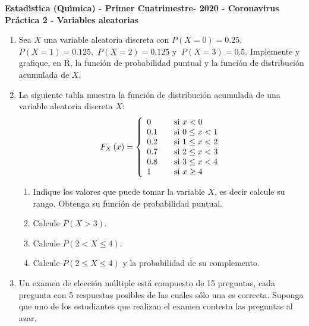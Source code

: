 \documentclass[11pt,a4paper,twoside]{article}%
\begin{document}
\begin{center}
\textbf{\textsf{Estad\'{\i}stica (Qu\'{\i}mica) - Primer Cuatrimestre- 2020 - Coronavirus}}\\
\vspace{0.2cm}
\textbf{Pr\'{a}ctica 2 - Variables aleatorias\vspace{-0.1in}}
\end{center}

\begin{enumerate}
\item Sea $X$ una variable aleatoria discreta con $P(X=0)=0.25,$
$P(X=1)=0.125,$ $P(X=2)=0.125$ y $\ P(X=3)=0.5$. Implemente y grafique, en R, la funci\'{o}n de
probabilidad puntual y la funci\'{o}n de distribuci\'{o}n acumulada de $X$.

\item La siguiente tabla muestra la funci\'{o}n de distribuci\'{o}n acumulada
de una variable aleatoria discreta $X$:%
\[
F_{X}\left(  x\right)  =\left\{
\begin{array}
[c]{lll}%
0 &  & \text{si }x<0\\
0.1 &  & \text{si }0\leq x<1\\
0.2 &  & \text{si }1\leq x<2\\
0.7 &  & \text{si }2\leq x<3\\
0.8 &  & \text{si }3\leq x<4\\
1 &  & \text{si }x\geq4
\end{array}
\right.
\]


\begin{enumerate}
\item Indique los  valores que puede tomar la variable $X$, es decir calcule su rango. Obtenga  su funci\'on de probabilidad puntual.

\item Calcule $P(X>3)$.

\item Calcule $P(2<X\leq4)$.

\item Calcule $P(2\leq X\leq4)$ y la probabilidad de su complemento.
\end{enumerate}

\item Un examen de elecci\'on m\'ultiple est\'{a} compuesto de 15 preguntas, cada
pregunta con 5 respuestas posibles de las cuales s\'{o}lo una es correcta.
Suponga que uno de los estudiantes que realizan el examen contesta las
preguntas al azar.


\end{enumerate}
\end{document}
